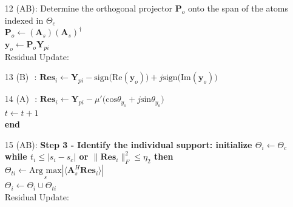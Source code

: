 {\begin{center}
{\begin{minipage}{1.2\linewidth}
\begin{algorithm}[H]
\begin{enumerate}
 identify the common support $\Theta_c $ that solves optimization problem \\
 \hspace*{\algorithmicindent} 
     $\Theta_t\leftarrow\underset{s} {Arg max} \sum_i^K |\langle \mathbf{A}_s^H \mathbf{Res}_i \rangle|$\\ \hspace*{\algorithmicindent}
      $\Theta_c \leftarrow \Theta_c \cup \Theta_t $  
\item[12 (AB):] Determine the orthogonal projector $\mathbf{P}_o$ onto the span of the atoms indexed in $\Theta_c$ \\              \hspace*{\algorithmicindent}   
     $\mathbf{P}_o \leftarrow (\mathbf{A}_s)(\mathbf{A}_s)^\dagger $\\
     \hspace*{\algorithmicindent} 
    $ \mathbf{y}_o \leftarrow \mathbf{P}_o \mathbf{Y}_{pi} $\\
Residual Update:
     \item[13 (B)\,\, :]$\mathbf{Res}_i \leftarrow\mathbf{Y}_{pi} -\text{sign(Re}(\mathbf{y}_o))+j\text{sign(Im}(\mathbf{y}_o))$
  \item[14  (A)\,\, :]  $ \mathbf{Res}_i \leftarrow \mathbf{Y}_{pi}- \mu' \Big(  \text{cos}\theta_{y_o} + j\text{sin}\theta_{y_o} \Big)$\\
    \hspace*{\algorithmicindent}
   $ t \leftarrow t+1 $ \\
 \textbf{end}
 \rule{0pt}{4ex}
 \item[15 (AB):]\textbf{Step 3 - Identify the individual support: initialize $\Theta_i \leftarrow \Theta_c $
 \\while $t_i \le |s_i-s_c|$ or $ \|\mathbf{Res}_i\|_F^2 \le \eta_2 $ then} \\ \hspace*{\algorithmicindent}
 $\Theta_{ti}\leftarrow\underset{s}{\text{Arg max}} |\langle \mathbf{A}_s^H \mathbf{Res}_i  \rangle|$\\ \hspace*{\algorithmicindent}
  $\Theta_i\leftarrow \Theta_i \cup \Theta_{ti} $\\
 Residual Update:
 \hspace*{\algorithmicindent}

\end{enumerate}
\end{algorithm}
\end{minipage}}
\end{center}}
